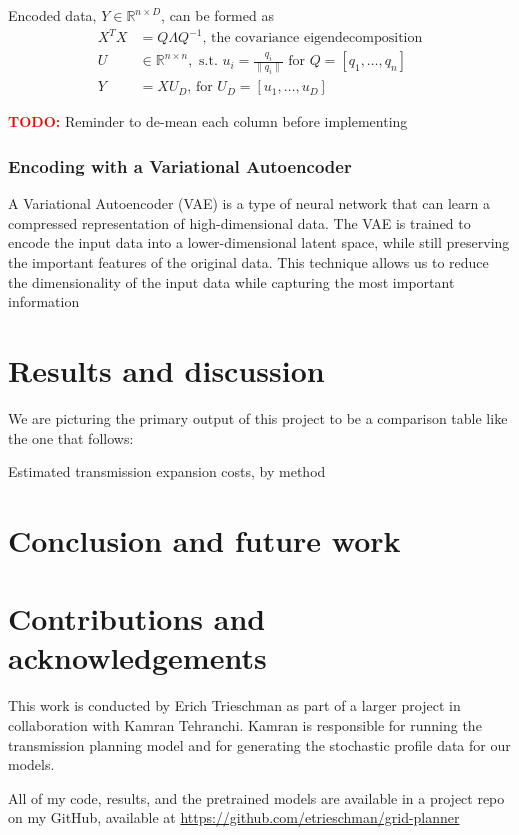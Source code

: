 \documentclass[10pt,twocolumn,letterpaper]{article}
\begin{document}
Encoded data, $Y \in \mathbb{R}^{n\times D}$, can be formed as 
\begin{align*}
    X^TX &= Q\Lambda Q^{-1} \textrm{, the covariance eigendecomposition}\\
    U &\in \mathbb{R}^{n\times n}, \textrm{ s.t. } u_i = \frac{q_i}{\lVert q_i \rVert} \textrm{ for } Q = [q_1, \dots, q_n]\\
    Y &= XU_D \textrm{, for } U_D = [u_1, \dots, u_D]
\end{align*}

\textcolor{red}{\textbf{TODO:}} Reminder to de-mean each column before implementing

\subsubsection{Encoding with a Variational Autoencoder}
A Variational Autoencoder (VAE) is a type of neural network that can learn a compressed representation of high-dimensional data. The VAE is trained to encode the input data into a lower-dimensional latent space, while still preserving the important features of the original data. This technique allows us to reduce the dimensionality of the input data while capturing the most important information \cite{odaibo2019tutorial}


\section{Results and discussion}
\label{sec:results}

We are picturing the primary output of this project to be a comparison table like the one that follows:
\begin{table}[!htbp]
    \tiny
    \begin{center}
        \caption{\label{fig:summ} Estimated transmission expansion costs, by method}
        
    \end{center}
\end{table}

\section{Conclusion and future work}
\label{sec:conclusion}


\section{Contributions and acknowledgements}
\label{sec:contrib}
This work is conducted by Erich Trieschman as part of a larger project in collaboration with Kamran Tehranchi. Kamran is responsible for running the transmission planning model and for generating the stochastic profile data for our models. 

All of my code, results, and the pretrained models are available in a project repo on my GitHub, available at \url{https://github.com/etrieschman/grid-planner}

{\small


}
\end{document}

